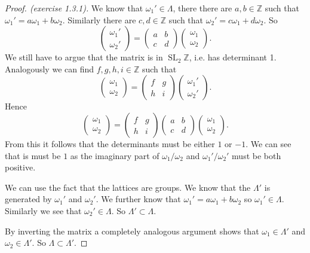\documentclass[a4paper]{article}
\theoremstyle{theoremdd}
\theoremstyle{definitiondd}
\theoremstyle{remarkdd}
\newcommand{\Z}{\mathbb{Z}}
\newcommand{\ltr}{\par \noindent \framebox[1\width]{ $\implies$ } \hspace{.2cm}}
\newcommand{\rtl}{\par \noindent \framebox[1\width]{ $\impliedby$ } \hspace{.2cm} }
\DeclareMathOperator{\SL}{SL}
\begin{document}
\begin{proof}[Proof. (exercise 1.3.1)]
	\ltr
	We know that $\omega_1' \in \Lambda$, there there are $a, b \in \Z$ such that $\omega_1' = a \omega_1 + b \omega_2$. Similarly there are $c, d \in \Z$ such that $\omega_2' = c \omega_1 + d \omega_2$. 
	So  \[
	\begin{pmatrix} \omega_1' \\ \omega_2' \end{pmatrix}  = 
	\begin{pmatrix} a & b \\ c& d \end{pmatrix} 
	\begin{pmatrix} \omega_1 \\ \omega_2 \end{pmatrix} 
	.\] 
	We still have to argue that the matrix is in $\SL_2\Z$, i.e. has determinant 1. 
	Analogously we can find $f, g, h, i \in \Z$ such that \[
	\begin{pmatrix} \omega_1  \\ \omega_2 \end{pmatrix}  = 
	\begin{pmatrix} f & g \\ h& i \end{pmatrix} 
	\begin{pmatrix} \omega_1' \\ \omega_2' \end{pmatrix} 
	.\]
	Hence \[
	\begin{pmatrix} \omega_1 \\ \omega_2 \end{pmatrix}  = 
	\begin{pmatrix} f & g \\ h & i \end{pmatrix} 
	\begin{pmatrix} a & b \\ c & d  \end{pmatrix} 
	\begin{pmatrix} \omega_1 \\ \omega_2 \end{pmatrix} 
	.\]  
	From this it follows that the determinants must be either $1$ or $-1$. 
	We can see that is must be $1$ as the imaginary part of $\omega_1 / \omega_2$ and $\omega_1' / \omega_2'$ must be both positive.
	\rtl
	We can use the fact that the lattices are groups. We know that the $\Lambda'$ is generated by $\omega_1'$ and $\omega_2'$.
	We further know that $\omega_1' = a \omega_1 + b \omega_2$ so $\omega_1' \in \Lambda$. 
	Similarly we see that $\omega_2' \in \Lambda$.
	So $\Lambda' \subset  \Lambda$.

	By inverting the matrix a completely analogous argument shows that $\omega_1 \in \Lambda'$ and $\omega_2 \in \Lambda'$. So $\Lambda \subset \Lambda'$.
\end{proof}
\end{document}
